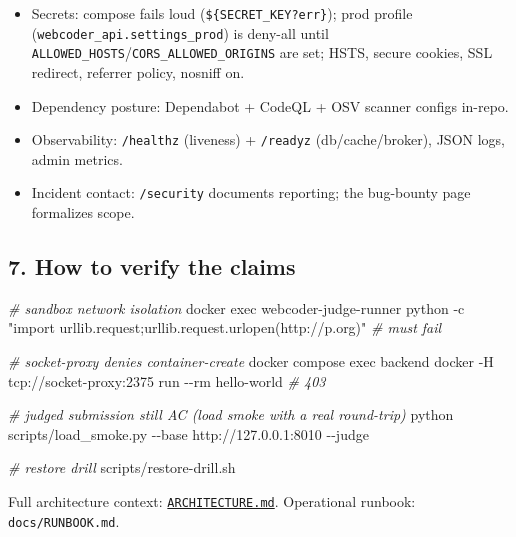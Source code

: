 \documentclass[
]{article}
\newenvironment{Shaded}{}{}
\newcommand{\AttributeTok}[1]{\textcolor[rgb]{0.49,0.56,0.16}{#1}}
\newcommand{\CommentTok}[1]{\textcolor[rgb]{0.38,0.63,0.69}{\textit{#1}}}
\newcommand{\ExtensionTok}[1]{#1}
\newcommand{\NormalTok}[1]{#1}
\newcommand{\StringTok}[1]{\textcolor[rgb]{0.25,0.44,0.63}{#1}}
\providecommand{\tightlist}{%
  \setlength{\itemsep}{0pt}\setlength{\parskip}{0pt}}
\begin{document}
\begin{itemize}
\tightlist
\item
  Secrets: compose fails loud (\texttt{\$\{SECRET\_KEY?err\}}); prod
  profile (\texttt{webcoder\_api.settings\_prod}) is deny-all until
  \texttt{ALLOWED\_HOSTS}/\texttt{CORS\_ALLOWED\_ORIGINS} are set; HSTS,
  secure cookies, SSL redirect, referrer policy, nosniff on.
\item
  Dependency posture: Dependabot + CodeQL + OSV scanner configs in-repo.
\item
  Observability: \texttt{/healthz} (liveness) + \texttt{/readyz}
  (db/cache/broker), JSON logs, admin metrics.
\item
  Incident contact: \texttt{/security} documents reporting; the
  bug-bounty page formalizes scope.
\end{itemize}

\subsection{7. How to verify the
claims}\label{7-how-to-verify-the-claims}

\begin{Shaded}
\begin{Highlighting}[]
\CommentTok{\# sandbox network isolation}
\ExtensionTok{docker}\NormalTok{ exec webcoder{-}judge{-}runner python }\AttributeTok{{-}c} \StringTok{"import urllib.request;urllib.request.urlopen(\textquotesingle{}http://p.org\textquotesingle{})"}   \CommentTok{\# must fail}

\CommentTok{\# socket{-}proxy denies container{-}create}
\ExtensionTok{docker}\NormalTok{ compose exec backend docker }\AttributeTok{{-}H}\NormalTok{ tcp://socket{-}proxy:2375 run }\AttributeTok{{-}{-}rm}\NormalTok{ hello{-}world   }\CommentTok{\# 403}

\CommentTok{\# judged submission still AC (load smoke with a real round{-}trip)}
\ExtensionTok{python}\NormalTok{ scripts/load\_smoke.py }\AttributeTok{{-}{-}base}\NormalTok{ http://127.0.0.1:8010 }\AttributeTok{{-}{-}judge}

\CommentTok{\# restore drill}
\ExtensionTok{scripts/restore{-}drill.sh}
\end{Highlighting}
\end{Shaded}

Full architecture context:
\href{ARCHITECTURE.md}{\texttt{ARCHITECTURE.md}}. Operational runbook:
\texttt{docs/RUNBOOK.md}.
\end{document}
